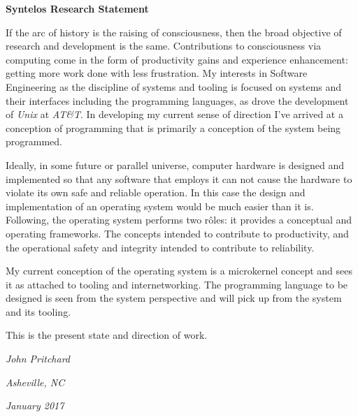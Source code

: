 

\bf Syntelos Research Statement

\bigskip

\rm

If the arc of history is the raising of consciousness, then the broad
objective of research and development is the same.  Contributions to
consciousness via computing come in the form of productivity gains and
experience enhancement: getting more work done with less frustration.
My interests in Software Engineering as the discipline of systems and
tooling is focused on systems and their interfaces including the
programming languages, as drove the development of {\it Unix} at {\it
AT\&T}.  In developing my current sense of direction I've arrived at a
conception of programming that is primarily a conception of the system
being programmed.

Ideally, in some future or parallel universe, computer hardware is
designed and implemented so that any software that employs it can not
cause the hardware to violate its own safe and reliable operation.  In
this case the design and implementation of an operating system would
be much easier than it is.  Following, the operating system performs
two r\^oles: it provides a conceptual and operating frameworks.  The
concepts intended to contribute to productivity, and the operational
safety and integrity intended to contribute to reliability.

My current conception of the operating system is a microkernel concept
and sees it as attached to tooling and internetworking.  The
programming language to be designed is seen from the system
perspective and will pick up from the system and its tooling.

This is the present state and direction of work.

\bigskip

{\it John Pritchard}

{\it Asheville, NC}

{\it January 2017}

\bye
